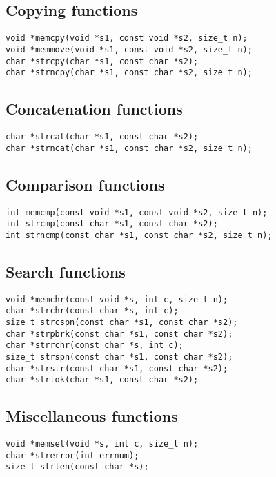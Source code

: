 \documentclass[a4paper,11pt,draft]{article}
\begin{document}
\subsection*{Copying functions}

\begin{verbatim}
void *memcpy(void *s1, const void *s2, size_t n);
void *memmove(void *s1, const void *s2, size_t n);
char *strcpy(char *s1, const char *s2);
char *strncpy(char *s1, const char *s2, size_t n);
\end{verbatim}

\subsection*{Concatenation functions}

\begin{verbatim}
char *strcat(char *s1, const char *s2);
char *strncat(char *s1, const char *s2, size_t n);
\end{verbatim}

\subsection*{Comparison functions}

\begin{verbatim}
int memcmp(const void *s1, const void *s2, size_t n);
int strcmp(const char *s1, const char *s2);
int strncmp(const char *s1, const char *s2, size_t n);
\end{verbatim}

\subsection*{Search functions}

\begin{verbatim}
void *memchr(const void *s, int c, size_t n);
char *strchr(const char *s, int c);
size_t strcspn(const char *s1, const char *s2);
char *strpbrk(const char *s1, const char *s2);
char *strrchr(const char *s, int c);
size_t strspn(const char *s1, const char *s2);
char *strstr(const char *s1, const char *s2);
char *strtok(char *s1, const char *s2);
\end{verbatim}

\subsection*{Miscellaneous functions}

\begin{verbatim}
void *memset(void *s, int c, size_t n);
char *strerror(int errnum);
size_t strlen(const char *s);
\end{verbatim}
\end{document}
